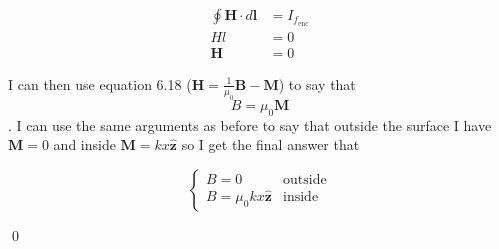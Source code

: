 \documentclass{homework}
\newcommand{\bs}[1]{\ensuremath{\boldsymbol{#1}}}
\newcommand{\bhat}[1]{\ensuremath{\boldsymbol{\hat{#1}}}}
\begin{document}
\begin{homeworkProblem}[Problem 6.12]
{\begin{enumerate}
        \begin{align*}
          \oint \bs{H} \cdot d \bs{l} &= I_{f_{\text{enc}}} \\
            H l &= 0 \\
            \bs{H}  &= 0
        \end{align*}

        I can then use equation 6.18 ($\bs{H} = \frac{1}{\mu_0} \bs{B} - \bs{M}$) to say that $$B = \mu_0 \bs{M}$$. I can use the same arguments as before to say that outside the surface I have $\bs{M} = 0$ and inside $\bs{M} = k x \bhat{z}$ so I get the final answer that

        $$
        \begin{cases}
          B = 0 &\text{outside} \\
          B = \mu_0 k x \bhat{z} &\text{inside}
        \end{cases}
        $$

    \end{enumerate}

    \qed

  }
\end{homeworkProblem}
\end{document}
